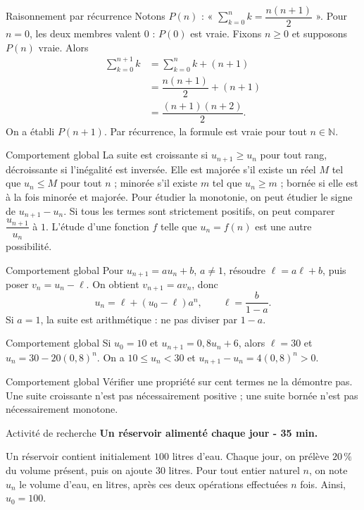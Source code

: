 \documentclass[aspectratio=169,10pt]{beamer}
\providecommand{\N}{\mathbb{N}}
\begin{document}
\begin{frame}{Raisonnement par récurrence}
Notons \(P(n)\) : « \(\sum_{k=0}^n k=\dfrac{n(n+1)}{2}\) ».
Pour \(n=0\), les deux membres valent \(0\) : \(P(0)\) est vraie.
Fixons \(n\ge0\) et supposons \(P(n)\) vraie. Alors
\[\begin{aligned}\sum_{k=0}^{n+1}k&=\sum_{k=0}^nk+(n+1)\\&=\dfrac{n(n+1)}2+(n+1)\\&=\dfrac{(n+1)(n+2)}2.\end{aligned}\]
On a établi \(P(n+1)\). Par récurrence, la formule est vraie pour tout \(n\in\N\).
\end{frame}
\begin{frame}{Comportement global}
La suite est croissante si \(u_{n+1}\ge u_n\) pour tout rang, décroissante si l'inégalité est inversée. Elle est majorée s'il existe un réel \(M\) tel que \(u_n\le M\) pour tout \(n\) ; minorée s'il existe \(m\) tel que \(u_n\ge m\) ; bornée si elle est à la fois minorée et majorée.
Pour étudier la monotonie, on peut étudier le signe de \(u_{n+1}-u_n\). Si tous les termes sont strictement positifs, on peut comparer \(\dfrac{u_{n+1}}{u_n}\) à \(1\). L'étude d'une fonction \(f\) telle que \(u_n=f(n)\) est une autre possibilité.
\end{frame}
\begin{frame}{Comportement global}
Pour \(u_{n+1}=au_n+b\), \(a\ne1\), résoudre \(\ell=a\ell+b\), puis poser \(v_n=u_n-\ell\). On obtient \(v_{n+1}=av_n\), donc
\[u_n=\ell+(u_0-\ell)a^n,\qquad\ell=\dfrac{b}{1-a}.\]
Si \(a=1\), la suite est arithmétique : ne pas diviser par \(1-a\).
\end{frame}
\begin{frame}{Comportement global}
Si \(u_0=10\) et \(u_{n+1}=0{,}8u_n+6\), alors \(\ell=30\) et \(u_n=30-20(0{,}8)^n\). On a \(10\le u_n<30\) et \(u_{n+1}-u_n=4(0{,}8)^n>0\).
\end{frame}
\begin{frame}{Comportement global}
Vérifier une propriété sur cent termes ne la démontre pas. Une suite croissante n'est pas nécessairement positive ; une suite bornée n'est pas nécessairement monotone.
\end{frame}
\begin{frame}{Activité de recherche}
\textbf{Un réservoir alimenté chaque jour - 35 min.}

Un réservoir contient initialement \(100\) litres d'eau. Chaque jour, on prélève \(20\,\%\) du volume présent, puis on ajoute \(30\) litres. Pour tout entier naturel \(n\), on note \(u_n\) le volume d'eau, en litres, après ces deux opérations effectuées \(n\) fois. Ainsi, \(u_0=100\).
\end{frame}
\end{document}
